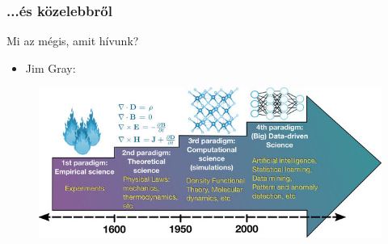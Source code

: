 \begin{frame}
\frametitle{...és közelebbről}

\pause

\begin{block}{Mi az mégis, amit  hívunk?}
	\begin{itemize}
		\item Jim Gray: 
	\end{itemize}
\end{block}

\pause

\begin{figure}
	\includegraphics[width=1.0\textwidth]{img/4th-paradigm.jpeg}
\end{figure}

\end{frame}